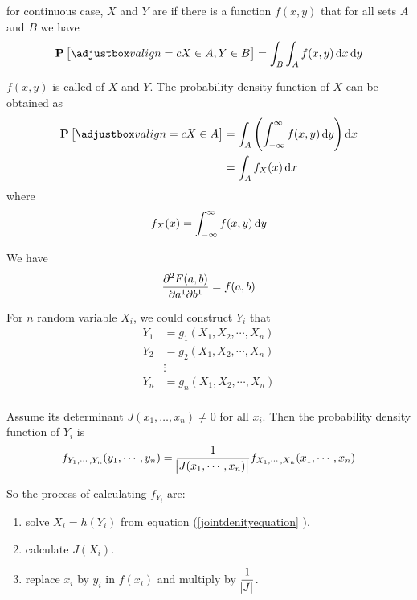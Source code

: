 \begin{definition}
    for continuous case, $X$ and $Y$ are  if there is a function $f(x,y)$ that for all sets $A$ and $B$ we have 
\begin{equation}
    \probability{X \in A, Y \in B} = \int_B \int_A f(x,y) \dif{x} \dif{y}
\end{equation}

$f(x,y)$ is called  of $X$ and $Y$. The probability density function of $X$ can be obtained as
\begin{equation}
    \begin{aligned}
        \probability{X \in A} &= \int_A \left( \int_{-\infty}^\infty f(x,y) \dif{y} \right) \dif{x}  \\
        &= \int_A f_X (x) \dif{x}
    \end{aligned}
\end{equation}
where
\begin{equation}
     f_X(x) = \int_{-\infty}^\infty f(x,y) \dif{y}
\end{equation}

We have 
\begin{equation}
    \dmd{F(a,b)}{2}{a}{1}{b}{1} = f(a,b)
\end{equation}
\end{definition}

For $n$ random variable $X_i$, we could construct $Y_i$ that
\begin{equation}\label{jointdenityequation}
    \begin{aligned}
        Y_1 &= g_1 (X_1, X_2, \cdots, X_n) \\
        Y_2 &= g_2 (X_1, X_2, \cdots, X_n) \\
        & \vdots \\
        Y_n &= g_n (X_1, X_2, \cdots, X_n) \\
    \end{aligned}
\end{equation}

Assume its  determinant $J(x_1, \dots, x_n) \neq 0$ for all $x_i$. Then the probability density function of $Y_i$ is 
\begin{equation}
    f_{Y_1, \cdots, Y_n}(y_1, \cdots, y_n) = \frac{1}{\abs{J(x_1, \cdots, x_n)}} f_{X_1, \cdots, X_n}(x_1, \cdots , x_n)
\end{equation}

So the process of calculating $f_{Y_i}$ are:
\begin{enumerate}
    \item solve $X_i = h(Y_i)$ from equation (\ref{jointdenityequation} ).
    \item calculate $J(X_i)$.
    \item replace $x_i$ by $y_i$ in $f(x_i)$ and multiply by $\displaystyle \frac{1}{\abs{J}}$.
\end{enumerate}

